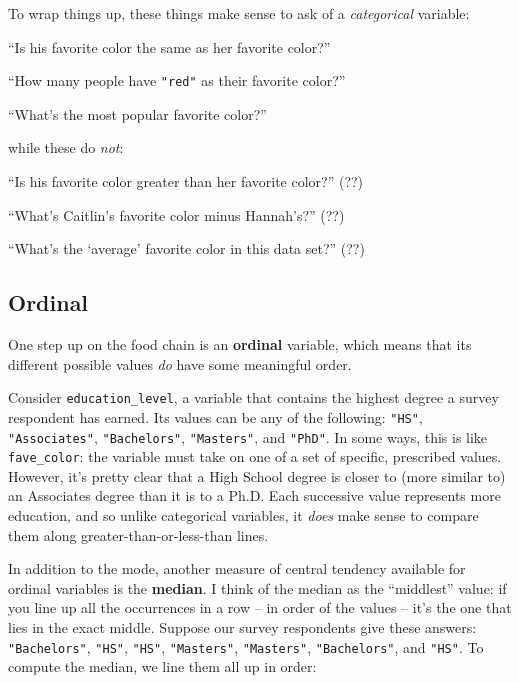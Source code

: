 To wrap things up, these things make sense to ask of a \textit{categorical}
variable:

\begin{compactitem}
\item[\leftthumbsup] ``Is his favorite color the same as her favorite color?''
\item[\leftthumbsup] ``How many people have \texttt{"red"} as their favorite
color?''
\item[\leftthumbsup] ``What's the most popular favorite color?''
\end{compactitem}

while these do \textit{not}:

\begin{compactitem}
\item[\leftthumbsdown] ``Is his favorite color greater than her favorite
color?'' (??)
\item[\leftthumbsdown] ``What's Caitlin's favorite color minus Hannah's?'' (??)
\item[\leftthumbsdown] ``What's the `average' favorite color in this data
set?'' (??)
\end{compactitem}


\subsection{Ordinal}

One step up on the food chain is an \textbf{ordinal} variable, which means that
its different possible values \textit{do} have some meaningful order.

Consider \texttt{education\_level}, a variable that contains the highest degree
a survey respondent has earned. Its values can be any of the following:
\texttt{"HS"}, \texttt{"Associates"}, \texttt{"Bachelors"}, \texttt{"Masters"},
and \texttt{"PhD"}. In some ways, this is like \texttt{fave\_color}: the
variable must take on one of a set of specific, prescribed values. However,
it's pretty clear that a High School degree is closer to (more similar to) an
Associates degree than it is to a Ph.D. Each successive value represents more
education, and so unlike categorical variables, it \textit{does} make sense to
compare them along greater-than-or-less-than lines.

In addition to the mode, another measure of central tendency available for
ordinal variables is the \textbf{median}. I think of the median as the
``middlest'' value: if you line up all the occurrences in a row -- in order of
the values -- it's the one that lies in the exact middle. Suppose our survey
respondents give these answers: \texttt{"Bachelors"}, \texttt{"HS"},
\texttt{"HS"}, \texttt{"Masters"}, \texttt{"Masters"}, \texttt{"Bachelors"},
and \texttt{"HS"}. To compute the median, we line them all up in order:

